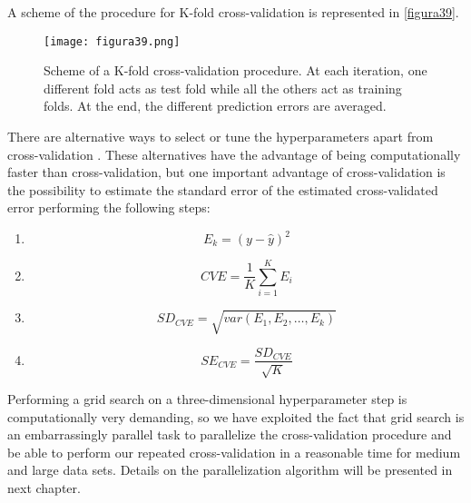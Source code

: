 \vspace{20pt}
A scheme of the procedure for K-fold cross-validation is represented in \autoref{figura39}.

\begin{figure}[hbtp]
\centering
\texttt{[image: figura39.png]}
\caption[Scheme of a K-fold cross-validation procedure]{Scheme of a K-fold cross-validation procedure. At each iteration, one different fold acts as test fold while all the others act as training folds. At the end, the different prediction errors are averaged.}
\label{figura39}
\end{figure}


There are alternative ways to select or tune the hyperparameters apart from cross-validation \parencite{vujavcic2015computationally, zhang2010regularization}. These alternatives have the advantage of being computationally faster than cross-validation, but one important advantage of cross-validation is the possibility to estimate the standard error of the estimated cross-validated error performing the following steps: 

\vspace{15pt}
\begin{enumerate}
    \item \begin{equation}
    E_k=(y - \hat{y})^2
    \end{equation}
    \item \begin{equation}
    CVE=\frac{1}{K}\sum_{i=1}^{K}E_i
    \end{equation}
    \item \begin{equation}
    SD_{CVE}=\sqrt{var(E_1, E_2, \dots, E_k)}
    \end{equation}
    \item \begin{equation}
    SE_{CVE}=\frac{SD_{CVE}}{\sqrt{K}}
    \end{equation}
\label{secve}
\end{enumerate}

Performing a grid search on a three-dimensional hyperparameter step is computationally very demanding, so we have exploited the fact that grid search is an embarrassingly parallel task \parencite{mcgibbon2016osprey} to parallelize the cross-validation procedure and be able to perform our repeated cross-validation in a reasonable time for medium and large data sets. Details on the parallelization algorithm will be presented in next chapter.

